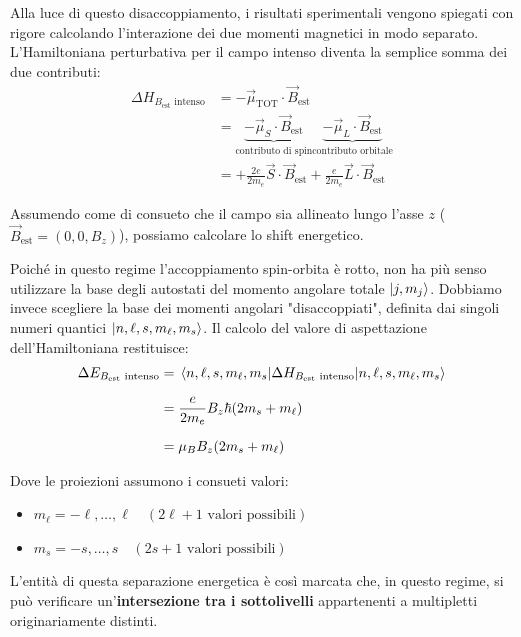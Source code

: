 Alla luce di questo disaccoppiamento, i risultati sperimentali vengono spiegati con rigore calcolando l'interazione dei due momenti magnetici in modo separato. L'Hamiltoniana perturbativa per il campo intenso diventa la semplice somma dei due contributi:
\begin{align}
    \Delta H_{B_{\text{est}} \text{ intenso}} &= -\vec{\mu}_{\text{TOT}} \cdot \vec{B}_{\text{est}} \nonumber \\[1.5ex]
    &= \underbrace{- \vec{\mu}_S \cdot \vec{B}_{\text{est}}}_{\text{contributo di spin}} \underbrace{- \vec{\mu}_L \cdot \vec{B}_{\text{est}}}_{\text{contributo orbitale}} \nonumber \\[1.5ex]
    &= + \frac{2e}{2m_e} \vec{S} \cdot \vec{B}_{\text{est}} + \frac{e}{2m_e} \vec{L} \cdot \vec{B}_{\text{est}}
\end{align}

Assumendo come di consueto che il campo sia allineato lungo l'asse \( z \) (\( \vec{B}_{\text{est}} = (0, 0, B_z) \)), possiamo calcolare lo shift energetico. 

Poiché in questo regime l'accoppiamento spin-orbita è rotto, non ha più senso utilizzare la base degli autostati del momento angolare totale \( \ket{j, m_j} \). Dobbiamo invece scegliere la base dei momenti angolari "disaccoppiati", definita dai singoli numeri quantici \( \ket{n, \ell, s, m_\ell, m_s} \). 
Il calcolo del valore di aspettazione dell'Hamiltoniana restituisce:
\begin{align}
    \Delta E_{B_{\text{est}} \text{ intenso}} &= \mel{n, \ell, s, m_\ell, m_s}{\Delta H_{B_{\text{est}} \text{ intenso}}}{n, \ell, s, m_\ell, m_s} \nonumber \\[1.5ex]
    &= \frac{e}{2m_e} B_z \hbar (2m_s + m_\ell) \nonumber \\[1.5ex]
    &= \mu_B B_z (2m_s + m_\ell)
\end{align}

Dove le proiezioni assumono i consueti valori:
\begin{itemize}
    \item \( m_\ell = -\ell, \dots, \ell \quad (2\ell+1 \text{ valori possibili}) \)
    \item \( m_s = -s, \dots, s \quad (2s+1 \text{ valori possibili}) \)
\end{itemize}

L'entità di questa separazione energetica è così marcata che, in questo regime, si può verificare un'\textbf{intersezione tra i sottolivelli} appartenenti a multipletti originariamente distinti.

